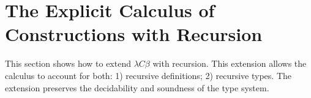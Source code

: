 \section{The Explicit Calculus of Constructions with Recursion}


This section shows how to extend $\lambda C\beta$ with recursion. This extension 
allows the calculus to account for both: 1) recursive definitions; 2) recursive types. 
The extension preserves the decidability and soundness of the type system.


